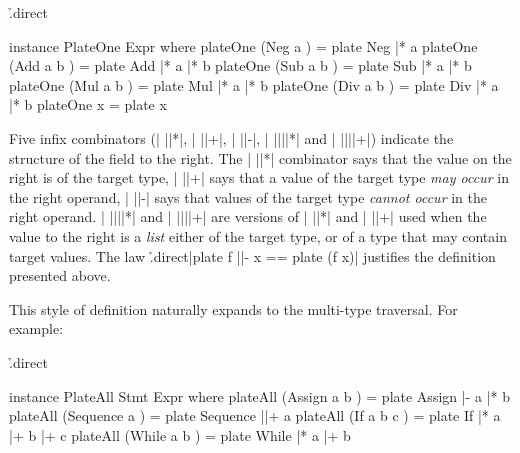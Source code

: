 \begin{comment}
\h{.direct}\begin{code}
class PlateAll from to where
    plateAll :: from -> Type from to
class PlateOne to where
    plateOne :: to -> Type to to
type Type from to = (Str to, Str to -> from)
plate :: from -> Type from to
(|*) :: Type (to -> from) to -> to -> Type from to
(|+) :: PlateAll item to => Type (item -> from) to -> item -> Type from to
(|-) :: Type (item -> from) to -> item -> Type from to
(||*) :: Type ([to] -> from) to -> [to] -> Type from to
(||+) :: PlateAll item to => Type ([item] -> from) to -> [item] -> Type from to
\end{code}
\end{comment}

\h{.direct}\begin{code}
instance PlateOne Expr where
    plateOne (Neg  a    )  = plate Neg  |* a
    plateOne (Add  a b  )  = plate Add  |* a |* b
    plateOne (Sub  a b  )  = plate Sub  |* a |* b
    plateOne (Mul  a b  )  = plate Mul  |* a |* b
    plateOne (Div  a b  )  = plate Div  |* a |* b
    plateOne x             = plate x
\end{code}

Five infix combinators (| ||*|, | ||+|, | ||-|, | ||||*| and | ||||+|) indicate the structure of the field to the right. The | ||*| combinator says that the value on the right is of the target type, | ||+| says that a value of the target type \textit{may occur} in the right operand, | ||-| says that values of the target type \textit{cannot occur} in the right operand. | ||||*| and | ||||+| are versions of | ||*| and | ||+| used when the value to the right is a \textit{list} either of the target type, or of a type that may contain target values. The law \h{.direct}|plate f ||- x == plate (f x)| justifies the definition presented above.

This style of definition naturally expands to the multi-type traversal. For example:

\begin{onepage}
\h{.direct}\begin{code}
instance PlateAll Stmt Expr where
    plateAll (Assign    a b    ) = plate Assign    |-   a |*  b
    plateAll (Sequence  a      ) = plate Sequence  ||+  a
    plateAll (If        a b c  ) = plate If        |*   a |+  b |+ c
    plateAll (While     a b    ) = plate While     |*   a |+  b
\end{code}
\end{onepage}

